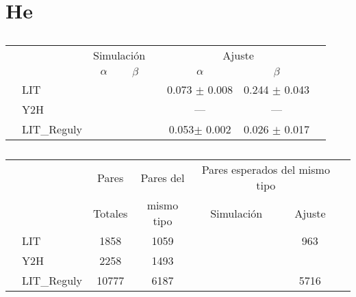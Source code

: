 \section{He}

\begin{table}[!ht]
    \centering
    \caption{\label{tab:probas}}
    {\scriptsize
    \begin{tabularx}{.9\columnwidth}{XlccXccX}
        \hline\hline
        &               &  \multicolumn{2}{c}{Simulaci\'on}  &&  \multicolumn{2}{c}{Ajuste}          &      \\
        \cline{3-4} \cline{6-7}
        &               &   $\alpha$    & $\beta$            &&   $\alpha$       &       $\beta$     & \\
        \hline
        & LIT           &    &         && 0.073 $\pm$ 0.008  & 0.244 $\pm$ 0.043       &               \\
        & Y2H           &    &         &&    ---             &   ---              &               \\
        & LIT\_Reguly   &    &         && 0.053$ \pm$ 0.002  & 0.026 $\pm$ 0.017       &               \\
        \hline\hline
    \end{tabularx}
    }
\end{table}


\begin{table}[!ht]
    \centering
    \caption{\label{tab:pairs}}
    {\scriptsize
    \begin{tabularx}{.9\columnwidth}{XlccccX}
        \hline\hline
        &               & Pares   & Pares del   & \multicolumn{2}{c}{Pares esperados del mismo tipo }             \\ 
        \cline{5-6}
        &               & Totales & mismo tipo  & Simulaci\'on  &        Ajuste         &      \\
        \hline
        & LIT           & 1858    & 1059        &               &          963          &               \\
        & Y2H           & 2258    & 1493        &               &                       &               \\
        & LIT\_Reguly   & 10777   & 6187        &               &         5716          &               \\
        \hline\hline
    \end{tabularx}
    }
\end{table}

